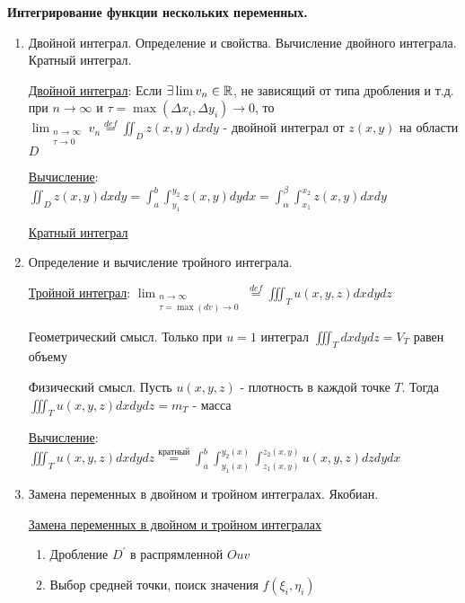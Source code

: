 \documentclass[12pt]{article}
\begin{document}
    \begin{center}
        \textbf{Интегрирование функции нескольких переменных.}
    \end{center}

    \begin{enumerate}
        \item Двойной интеграл. Определение и свойства. Вычисление двойного интеграла. Кратный интеграл.

        \hyperlink{doubleintegral}{Двойной интеграл}: Если $\exists \lim v_n \in \mathbb{R}$, не зависящий от типа дробления и т.д. при $n \rightarrow \infty$ и
        $\tau = \max (\Delta x_i, \Delta y_i) \to 0$, то $\lim_{\substack{n\to\infty \\ \tau \to 0}} v_n \stackrel{def}{=} \iint_D z(x, y) dx dy$ - двойной интеграл от $z(x, y)$ на области $D$

        \hyperlink{doubleintegralcalculation}{Вычисление}: $\iint_D z(x, y) dxdy = \int_a^b \int_{y_1}^{y_2} z(x, y) dydx = \int_\alpha^\beta \int_{x_1}^{x_2} z(x, y) dxdy$

        \hyperlink{multipleintegral}{Кратный интеграл}

        \item Определение и вычисление тройного интеграла.

        \hyperlink{tripleintegral}{Тройной интеграл}: $\lim_{\substack{n \to \infty \\ \tau = \max (dv) \to 0}} \stackrel{def}{=} \iiint_T u(x, y, z) dxdydz$

        Геометрический смысл. Только при $u = 1$ интеграл $\iiint_T dxdydz = V_T$ равен объему

        Физический смысл. Пусть $u(x, y, z)$ - плотность в каждой точке $T$. Тогда $\iiint_T u(x, y, z) dxdydz = m_T$ - масса

        \hyperlink{tripleintegralcalculation}{Вычисление}: $\iiint_T u(x, y, z) dxdydz \stackrel{\text{кратный}}{=} \int^b_a \int_{y_1(x)}^{y_2(x)} \int_{z_1(x, y)}^{z_2(x, y)} u(x, y, z) dz dy dx$


        \item Замена переменных в двойном и тройном интегралах. Якобиан.

        \hyperlink{substitutionindoubleintegral}{Замена переменных в двойном и тройном интегралах}

        \begin{enumerate}
            \item Дробление $D^\prime$ в распрямленной $Ouv$
            \item Выбор средней точки, поиск значения $f(\xi_i, \eta_i)$


\end{enumerate}
\end{enumerate}
\end{document}
